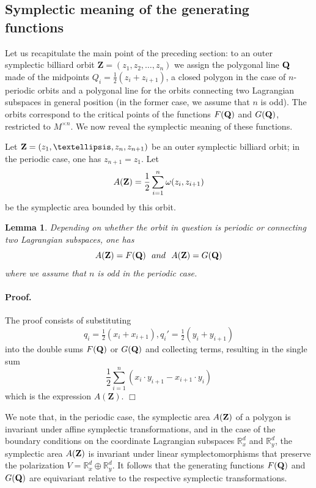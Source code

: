 \documentclass[12pt]{article}
\newtheorem{lemma}{Lemma}[section]
\newcommand{\proofend}{$\Box$\bigskip}
\newcommand{\R}{{\mathbb R}}
\def\proof{\paragraph{Proof.}}
\begin{document}
\subsection{Symplectic meaning of the generating functions} \label{subsect:area}

Let us recapitulate the main point of the preceding section: to an outer symplectic billiard orbit $\mathbf{Z}=(z_1,z_2,\ldots,z_n)$ we assign the polygonal line ${\bf Q}$ made of the midpoints  $Q_i = \tfrac12 (z_i + z_{i+1})$, a closed polygon in the case of $n$-periodic orbits and a polygonal line for the orbits connecting two Lagrangian subspaces in general position (in the former case, we assume that $n$ is odd). 
The orbits correspond to the critical points of the functions $F({\bf Q})$ and $G({\bf Q})$, restricted to $M^{\times n}$. 
We now reveal the symplectic meaning of these functions. 

Let ${\bf Z}=(z_1,\ldots,z_n,z_{n+1})$ be an outer symplectic billiard orbit; in the periodic case, one has $z_{n+1}=z_1$. Let 
$$
A({\bf Z}) = \frac{1}{2} \sum_{i=1}^n \omega(z_i,z_{i+1})
$$
be the symplectic area bounded by this orbit.%

\begin{lemma} \label{lm:revareas}
Depending on whether the orbit in question is periodic or connecting two Lagrangian subspaces, one has
$$
A({\bf Z})=F({\bf Q}) \ \ {\rm and}\  \ A({\bf Z})= G({\bf Q})
$$
where we assume that $n$ is odd in the periodic case.
\end{lemma}

\proof The proof consists of substituting 
$$
q_i=\tfrac12 (x_i + x_{i+1}), q_i'=\tfrac12 (y_i + y_{i+1})
$$
 into the double sums $F({\bf Q})$ or $G({\bf Q})$ and collecting terms, resulting in the single sum 
$$
\frac{1}{2} \sum_{i=1}^n (x_i \cdot y_{i+1} - x_{i+1} \cdot y_i)
$$
which is the expression $A(\mathbf{Z})$.
\proofend

We note that, in the periodic case, the symplectic area $A({\bf Z})$ of a polygon is invariant under affine symplectic transformations, and in the case of the boundary conditions on the coordinate Lagrangian subspaces $\R^d_x$ and $\R^d_y$, the symplectic area $A({\bf Z})$ is invariant under linear symplectomorphisms that preserve the polarization $V=\R^d_x \oplus \R^d_y$. It follows that the generating functions $F({\bf Q})$ and $G({\bf Q})$ are equivariant relative to the respective symplectic transformations.
\end{document}
